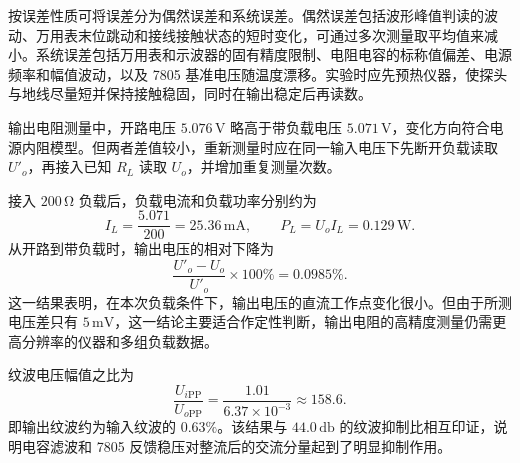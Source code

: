 \documentclass{../template/myrpt}
\begin{document}
按误差性质可将误差分为偶然误差和系统误差。偶然误差包括波形峰值判读的波动、万用表末位跳动和接线接触状态的短时变化，可通过多次测量取平均值来减小。系统误差包括万用表和示波器的固有精度限制、电阻电容的标称值偏差、电源频率和幅值波动，以及 7805 基准电压随温度漂移。实验时应先预热仪器，使探头与地线尽量短并保持接触稳固，同时在输出稳定后再读数。

输出电阻测量中，开路电压 $5.076\,\si{\volt}$ 略高于带负载电压 $5.071\,\si{\volt}$，变化方向符合电源内阻模型。但两者差值较小，重新测量时应在同一输入电压下先断开负载读取 $U'_o$，再接入已知 $R_L$ 读取 $U_o$，并增加重复测量次数。

接入 $200\,\si{\ohm}$ 负载后，负载电流和负载功率分别约为
\[
  I_L=\frac{5.071}{200}=25.36\,\si{\milli\ampere},\qquad
  P_L=U_oI_L=0.129\,\si{\watt}.
\]
从开路到带负载时，输出电压的相对下降为
\[
  \frac{U'_o-U_o}{U'_o}\times100\%=0.0985\%.
\]
这一结果表明，在本次负载条件下，输出电压的直流工作点变化很小。但由于所测电压差只有 $5\,\si{\milli\volt}$，这一结论主要适合作定性判断，输出电阻的高精度测量仍需更高分辨率的仪器和多组负载数据。

纹波电压幅值之比为
\[
  \frac{U_{i\mathrm{PP}}}{U_{o\mathrm{PP}}}
  =\frac{1.01}{6.37\times10^{-3}}\approx158.6.
\]
即输出纹波约为输入纹波的 $0.63\%$。该结果与 $44.0\,\si{\decibel}$ 的纹波抑制比相互印证，说明电容滤波和 7805 反馈稳压对整流后的交流分量起到了明显抑制作用。

\clearpage
\insertSignedDataPage
\end{document}
